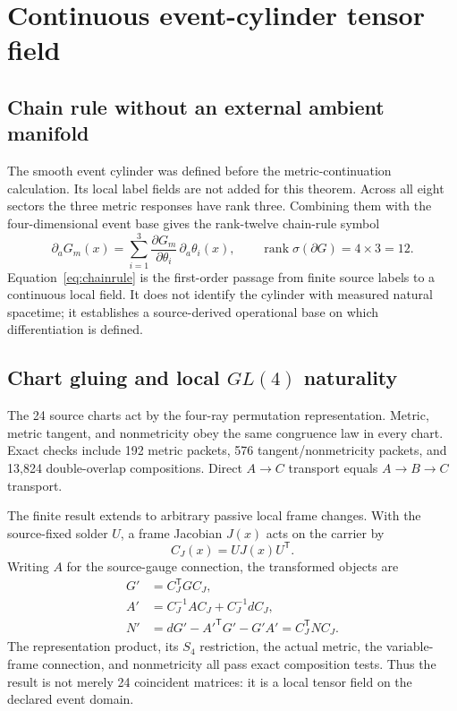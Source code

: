 \documentclass[11pt]{article}
\theoremstyle{definition}
\theoremstyle{remark}
\newcommand{\rank}{\operatorname{rank}}
\begin{document}
\section{Continuous event-cylinder tensor field}

\subsection{Chain rule without an external ambient manifold}

The smooth event cylinder was defined before the metric-continuation calculation. Its local label fields are not added for this theorem. Across all eight sectors the three metric responses have rank three. Combining them with the four-dimensional event base gives the rank-twelve chain-rule symbol
\begin{equation}\label{eq:chainrule}
 \partial_aG_m(x)=\sum_{i=1}^{3}
 \frac{\partial G_m}{\partial\theta_i}\,\partial_a\theta_i(x),
 \qquad \rank\sigma(\partial G)=4\times3=12.
\end{equation}
Equation~\eqref{eq:chainrule} is the first-order passage from finite source labels to a continuous local field. It does not identify the cylinder with measured natural spacetime; it establishes a source-derived operational base on which differentiation is defined.

\subsection{Chart gluing and local $GL(4)$ naturality}

The 24 source charts act by the four-ray permutation representation. Metric, metric tangent, and nonmetricity obey the same congruence law in every chart. Exact checks include 192 metric packets, 576 tangent/nonmetricity packets, and 13,824 double-overlap compositions. Direct $A\to C$ transport equals $A\to B\to C$ transport.

The finite result extends to arbitrary passive local frame changes. With the source-fixed solder $U$, a frame Jacobian $J(x)$ acts on the carrier by
\begin{equation}
 C_J(x)=U J(x)U^{\mathsf T}.
\end{equation}
Writing $A$ for the source-gauge connection, the transformed objects are
\begin{align}
 G'&=C_J^{\mathsf T}GC_J,\\
 A'&=C_J^{-1}AC_J+C_J^{-1}dC_J,\\
 N'&=dG'-A'^{\mathsf T}G'-G'A'=C_J^{\mathsf T}NC_J.
\end{align}
The representation product, its $S_4$ restriction, the actual metric, the variable-frame connection, and nonmetricity all pass exact composition tests. Thus the result is not merely 24 coincident matrices: it is a local tensor field on the declared event domain.
\end{document}
